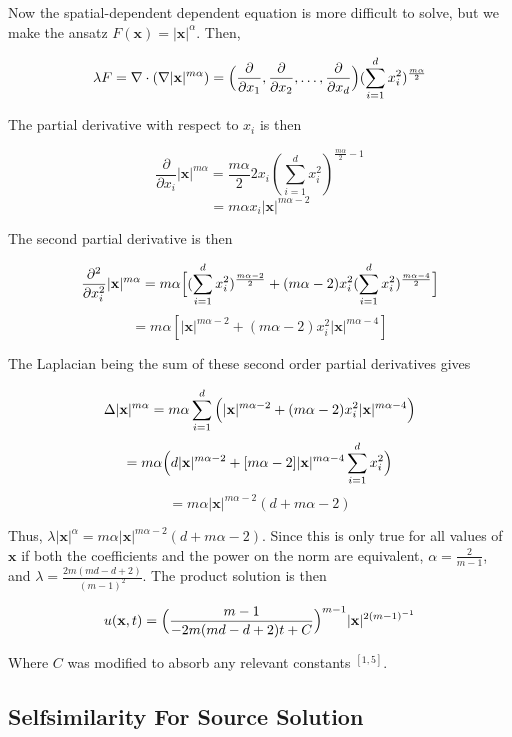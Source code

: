 \documentclass[paper=a4, fontsize=12pt]{scrartcl} %
\numberwithin{equation}{section} %
\numberwithin{table}{section} %
\begin{document}
Now the spatial-dependent dependent equation is more difficult to solve, but we make the ansatz $F(\mathbf{x})= |\mathbf{x}|^\alpha$. Then,

$$\lambda F = \nabla \cdot (\nabla |\mathbf{x}|^{m\alpha})= \Big{(}\frac{\partial}{\partial x_1}, \frac{\partial}{\partial x_2}, \dots, \frac{\partial}{\partial x_d}\Big{)}(\sum_{i=1}^d x_i^2)^{\frac{m\alpha}{2}}$$

The partial derivative with respect to $x_i$ is then

$$\frac{\partial}{\partial x_i}|\mathbf{x}|^{m\alpha} = \frac{m \alpha}{2} 2 x_i (\sum_{i=1}^d x_i^2)^{\frac{m\alpha}{2}-1}$$
$$= m\alpha x_i |\mathbf{x}|^{m \alpha -2}$$

The second partial derivative is then 

$$\frac{\partial ^2}{\partial x_i ^2} |\mathbf{x}|^{m \alpha} = m \alpha \Big{[}(\sum_{i=1}^d x_i^2)^{\frac{m\alpha -2 }{2}} + (m \alpha - 2) x_i^2 (\sum_{i=1}^d x_i^2)^{\frac{m\alpha-4}{2}}\Big{]}$$
$$ = m \alpha [|\mathbf{x}|^{m \alpha -2} + (m \alpha - 2) x_i^2|\mathbf{x}|^{m \alpha - 4}]$$

The Laplacian being the sum of these second order partial derivatives gives

$$\Delta |\mathbf{x}|^{m \alpha} = m \alpha \sum_{i=1}^d \Big{(}|\mathbf{x}|^{m \alpha -2} + (m \alpha - 2)x_i^2 |\mathbf{x}|^{m \alpha - 4}\Big{)}$$
$$=m \alpha \Big{(}d |\mathbf{x}|^{m \alpha -2} + [m \alpha - 2]|\mathbf{x}|^{m \alpha - 4}\sum_{i=1}^d x_i^2\Big{)} $$
$$= m \alpha |\mathbf{x}|^{m \alpha -2}(d + m \alpha -2)$$

Thus, $\lambda |\mathbf{x}|^\alpha = m \alpha |\mathbf{x}|^{m \alpha -2}(d + m \alpha -2)$. Since this is only true for all values of $\mathbf{x}$ if both the coefficients and the power on the norm are equivalent, $\alpha = \frac{2}{m - 1}$, and $\lambda = \frac{2m(md - d + 2)}{(m-1)^2}$. The product solution is then 

\begin{equation}
    u(\mathbf{x}, t) = \Big{(} \frac{m-1}{-2m(md -d + 2)t + C}\Big{)}^{m-1}|\mathbf{x}|^{2(m-1)^{-1}}
\end{equation}

Where $C$ was modified to absorb any relevant constants $^{[1, 5]}$. %


\subsection{Selfsimilarity For Source Solution}
\end{document}
